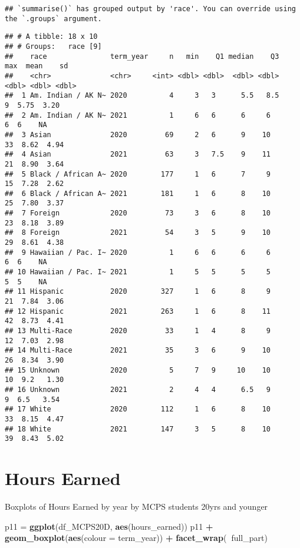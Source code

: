 \documentclass[]{article}
\newenvironment{Shaded}{\begin{snugshade}}{\end{snugshade}}
\newcommand{\DataTypeTok}[1]{\textcolor[rgb]{0.13,0.29,0.53}{#1}}
\newcommand{\KeywordTok}[1]{\textcolor[rgb]{0.13,0.29,0.53}{\textbf{#1}}}
\newcommand{\NormalTok}[1]{#1}
\newcommand{\OperatorTok}[1]{\textcolor[rgb]{0.81,0.36,0.00}{\textbf{#1}}}
\newcommand{\StringTok}[1]{\textcolor[rgb]{0.31,0.60,0.02}{#1}}
\begin{document}
\begin{verbatim}
## `summarise()` has grouped output by 'race'. You can override using the `.groups` argument.
\end{verbatim}

\begin{verbatim}
## # A tibble: 18 x 10
## # Groups:   race [9]
##    race               term_year     n   min    Q1 median    Q3   max  mean    sd
##    <chr>              <chr>     <int> <dbl> <dbl>  <dbl> <dbl> <dbl> <dbl> <dbl>
##  1 Am. Indian / AK N~ 2020          4     3   3      5.5   8.5     9  5.75  3.20
##  2 Am. Indian / AK N~ 2021          1     6   6      6     6       6  6    NA   
##  3 Asian              2020         69     2   6      9    10      33  8.62  4.94
##  4 Asian              2021         63     3   7.5    9    11      21  8.90  3.64
##  5 Black / African A~ 2020        177     1   6      7     9      15  7.28  2.62
##  6 Black / African A~ 2021        181     1   6      8    10      25  7.80  3.37
##  7 Foreign            2020         73     3   6      8    10      23  8.18  3.89
##  8 Foreign            2021         54     3   5      9    10      29  8.61  4.38
##  9 Hawaiian / Pac. I~ 2020          1     6   6      6     6       6  6    NA   
## 10 Hawaiian / Pac. I~ 2021          1     5   5      5     5       5  5    NA   
## 11 Hispanic           2020        327     1   6      8     9      21  7.84  3.06
## 12 Hispanic           2021        263     1   6      8    11      42  8.73  4.41
## 13 Multi-Race         2020         33     1   4      8     9      12  7.03  2.98
## 14 Multi-Race         2021         35     3   6      9    10      26  8.34  3.90
## 15 Unknown            2020          5     7   9     10    10      10  9.2   1.30
## 16 Unknown            2021          2     4   4      6.5   9       9  6.5   3.54
## 17 White              2020        112     1   6      8    10      33  8.15  4.47
## 18 White              2021        147     3   5      8    10      39  8.43  5.02
\end{verbatim}

\hypertarget{hours-earned}{%
\section{Hours Earned}\label{hours-earned}}

Boxplots of Hours Earned by year by MCPS students 20yrs and younger

\begin{Shaded}
\begin{Highlighting}[]
\NormalTok{p11 =}\StringTok{ }\KeywordTok{ggplot}\NormalTok{(df_MCPS20D, }\KeywordTok{aes}\NormalTok{(hours_earned))}
\NormalTok{p11 }\OperatorTok{+}\StringTok{ }\KeywordTok{geom_boxplot}\NormalTok{(}\KeywordTok{aes}\NormalTok{(}\DataTypeTok{colour =}\NormalTok{ term_year)) }\OperatorTok{+}
\StringTok{       }\KeywordTok{facet_wrap}\NormalTok{(}\OperatorTok{~}\NormalTok{full_part)}
\end{Highlighting}
\end{Shaded}
\end{document}
